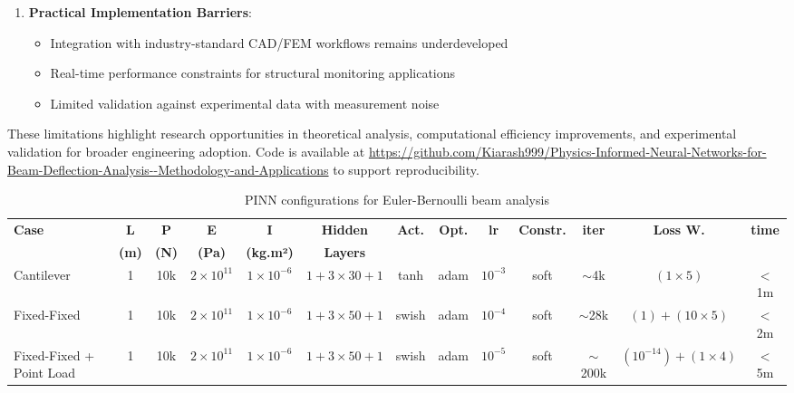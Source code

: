 \documentclass[twocolumn]{svjour3}
\begin{document}
\begin{enumerate}
		\item \textbf{Practical Implementation Barriers}: 
		\begin{itemize}
			\item Integration with industry-standard CAD/FEM workflows remains underdeveloped
			\item Real-time performance constraints for structural monitoring applications
			\item Limited validation against experimental data with measurement noise
		\end{itemize}
	\end{enumerate}
	
	These limitations highlight research opportunities in theoretical analysis, computational efficiency improvements, and experimental validation for broader engineering adoption. Code is available at \url{https://github.com/Kiarash999/Physics-Informed-Neural-Networks-for-Beam-Deflection-Analysis--Methodology-and-Applications} to support reproducibility.
	

	\begin{table}[htbp]
	  \centering
	  \caption{PINN configurations for Euler-Bernoulli beam analysis}
	  \label{tab:pinn_configs_compact}
	  \footnotesize
	  \setlength{\tabcolsep}{2pt}
	  \begin{tabularx}{\textwidth}{@{} >{\raggedright}p{2.5cm} c c c c c c c c c c c c @{}}
	    \toprule
	    \textbf{Case} & \textbf{L} & \textbf{P} & \textbf{E} & \textbf{I} & \textbf{Hidden} & \textbf{Act.} & \textbf{Opt.} & \textbf{lr} & \textbf{Constr.} & \textbf{iter} & \textbf{Loss W.} & \textbf{time} \\
	    & \textbf{(m)} & \textbf{(N)} & \textbf{(Pa)} & \textbf{(kg.m²)} & \textbf{Layers} & & & & & & & \\
	    \midrule
	    Cantilever & 1 & 10k & $2\times10^{11}$ & $1\times10^{-6}$ & $1+3\times30+1$ & tanh & adam & $10^{-3}$ & soft & $\sim$4k & $(1\times5)$ & $<$1m \\
	    Fixed-Fixed & 1 & 10k & $2\times10^{11}$ & $1\times10^{-6}$ & $1+3\times50+1$ & swish & adam & $10^{-4}$ & soft & $\sim$28k & $(1)+(10\times5)$ & $<$2m \\
	    Fixed-Fixed + Point Load & 1 & 10k & $2\times10^{11}$ & $1\times10^{-6}$ & $1+3\times50+1$ & swish & adam & $10^{-5}$ & soft & $\sim$200k & $(10^{-14})+(1\times4)$ & $<$5m \\
	    \bottomrule
	  \end{tabularx}
	\end{table}
\end{document}
